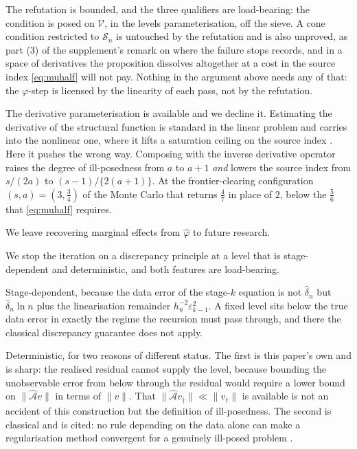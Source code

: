 \documentclass[
  12pt]{article}
\newcommand{\1}[1]{\mathds{1}\left[#1\right]}
\theoremstyle{plain}
\theoremstyle{definition}
\theoremstyle{definition}
\theoremstyle{remark}
\begin{document}
The refutation is bounded, and the three qualifiers are load-bearing:
the condition is posed on \(\mathcal V\), in the levels
parameterisation, off the sieve. A cone condition restricted to
\(\mathcal S_n\) is untouched by the refutation and is also unproved, as
part (3) of the supplement's remark on where the failure stops records,
and in a space of derivatives the proposition dissolves altogether at a
cost in the source index \eqref{eq:muhalf} will not pay. Nothing in the
argument above needs any of that: the \(\varphi\)-step is licensed by
the linearity of each pass, not by the refutation.

The derivative parameterisation is available and we decline it.
Estimating the derivative of the structural function is standard in the
linear problem and carries into the nonlinear one, where it lifts a
saturation ceiling on the source index
\citep{florens2012,centorrinofeveflorens2019}. Here it pushes the wrong
way. Composing with the inverse derivative operator raises the degree of
ill-posedness from \(a\) to \(a+1\) \emph{and} lowers the source index
from \(s/(2a)\) to \((s-1)/\{2(a+1)\}\). At the frontier-clearing
configuration \((s,a)=(3,\tfrac34)\) of the Monte Carlo that returns
\(\tfrac47\) in place of \(2\), below the \(\tfrac56\) that
\eqref{eq:muhalf} requires.

We leave recovering marginal effects from \(\hat\varphi\) to future
research.

We stop the iteration on a discrepancy principle at a level that is
stage-dependent and deterministic, and both features are load-bearing.

Stage-dependent, because the data error of the stage-\(k\) equation is
not \(\hat\delta_n\) but \(\hat\delta_n\ln n\) plus the linearisation
remainder \(h_u^{-2}\varepsilon_{k-1}^{2}\). A fixed level sits below
the true data error in exactly the regime the recursion must pass
through, and there the classical discrepancy guarantee does not apply.

Deterministic, for two reasons of different status. The first is this
paper's own and is sharp: the realised residual cannot supply the level,
because bounding the unobservable error from below through the residual
would require a lower bound on \(\|\hat{\mathcal A}v\|\) in terms of
\(\|v\|\). That \(\|\hat{\mathcal A}v_\dagger\|\ll\|v_\dagger\|\) is
available is not an accident of this construction but the definition of
ill-posedness. The second is classical and is cited: no rule depending
on the data alone can make a regularisation method convergent for a
genuinely ill-posed problem \citep{bakushinskii1984}.
\end{document}
